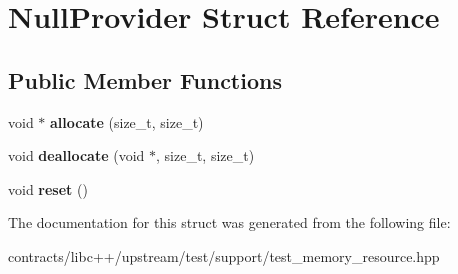 \hypertarget{struct_null_provider}{}\section{Null\+Provider Struct Reference}
\label{struct_null_provider}
\subsection*{Public Member Functions}
\begin{DoxyCompactItemize}
\item 
\mbox{\label{struct_null_provider_a2070e8cdb6d64121eb24092be919d5a0}} 
void $\ast$ {\bfseries allocate} (size\+\_\+t, size\+\_\+t)
\item 
\mbox{\label{struct_null_provider_af1e8dcc8bf395b528cf3074bd0ef0e0e}} 
void {\bfseries deallocate} (void $\ast$, size\+\_\+t, size\+\_\+t)
\item 
\mbox{\label{struct_null_provider_a49e06edbc41adee65c4b12421010c9ae}} 
void {\bfseries reset} ()
\end{DoxyCompactItemize}


The documentation for this struct was generated from the following file\+:\begin{DoxyCompactItemize}
\item 
contracts/libc++/upstream/test/support/test\+\_\+memory\+\_\+resource.\+hpp\end{DoxyCompactItemize}
